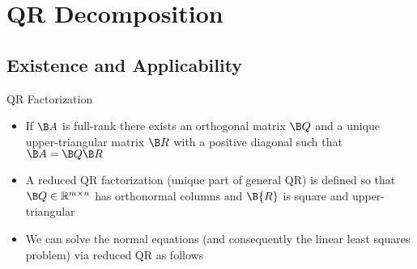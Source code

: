 \section{QR Decomposition}

\subsection{Existence and Applicability}

\begin{frame}{QR Factorization}


\begin{itemize}
\item If $\B A$ is full-rank there exists an orthogonal matrix $\B Q$ and a unique upper-triangular matrix $\B R$ with a positive diagonal such that \(\B A = \B Q \B R\)


\item A reduced QR factorization (unique part of general QR) is defined so that $\B Q\in\mathbb{R}^{m\times n}$ has orthonormal columns and $\B{R}$ is square and upper-triangular


\item We can solve the normal equations (and consequently the linear least squares problem) via reduced QR as follows
\mdcond{
\[\B A^\T \B A \B x = \B A^\T\B b 
\quad \Rightarrow\quad  \B{\hat{R}}^\T \underbrace{\B{\hat{Q}}^\T \B{\hat{Q}}}_{\B I} \B{\hat{R}} \B x = \B{\hat{R}}^\T\B{\hat{Q}}^\T\B b 
\quad \Rightarrow\quad \B{\hat{R}} \B x = \B{\hat{Q}}^\T\B b\]
}
\end{itemize}
\end{frame}

